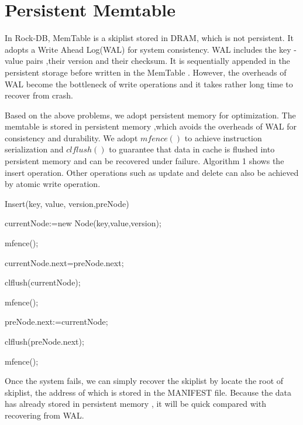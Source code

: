 \section{Persistent Memtable}
In Rock-DB, MemTable is a skiplist stored in DRAM, which is not persistent. It adopts a Write Ahead Log(WAL) for system consistency. WAL includes the key -value pairs ,their version and their checksum. It is sequentially appended in the persistent storage before written in the MemTable . However, the overheads of WAL become the bottleneck of write operations and it takes rather long time to recover from crash. 

Based on the above problems, we adopt persistent memory for optimization. 
The memtable is stored in persistent memory ,which avoids the overheads of WAL for consistency and durability. 
We adopt  $mfence()$ to achieve instruction serialization and $clflush()$ to guarantee that data in cache is flushed into persistent memory and can be recovered under failure. 
Algorithm 1 shows the insert operation. Other operations such as update and delete can also be achieved by atomic write operation.

\begin{algorithm}[t]
    \caption{Insert(key, value, version,preNode)} %
   
    
    currentNode:=new Node(key,value,version);
    
    mfence();
    
    currentNode.next=preNode.next;
    
    clflush(currentNode);
    
    mfence();
    
    preNode.next:=currentNode;
    
    clflush(preNode.next);
    
    mfence();

   
    \end{algorithm}

Once the system fails, 
we can simply recover the skiplist by locate the root of skiplist, 
the address of which is stored in the MANIFEST file. 
Because the data has already stored in persistent memory , 
it will be quick compared with recovering from WAL.
